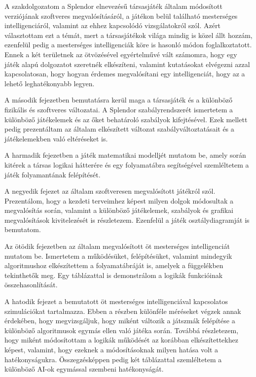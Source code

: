 
A szakdolgozatom a Splendor elnevezésű társasjáték általam módosított verziójának szoftveres megvalósításáról, a játékon belül található mesterséges intelligenciáról, valamint az ehhez kapcsolódó vizsgálatokról szól. Azért választottam ezt a témát, mert a társasjátékok világa mindig is közel állt hozzám, ezenfelül pedig a mesterséges intelligenciák köre is hasonló módon foglalkoztatott. Ennek a két területnek az ötvözésével egyértelművé vált számomra, hogy egy játék alapú dolgozatot szeretnék elkészíteni, valamint kutatásokat elvégezni azzal kapcsolatosan, hogy hogyan érdemes megvalósítani egy intelligenciát, hogy az a lehető leghatékonyabb legyen.

A második fejezetben bemutatásra kerül maga a társasjáték és a különböző fizikális és szoftveres változatai. A Splendor szabályrendszerét ismertetem a különböző játékelemek és az őket behatároló szabályok kifejtésével. Ezek mellett pedig prezentáltam az általam elkészített változat szabályváltoztatásait és a játékelemekben való eltéréseket is.

A harmadik fejezetben a játék matematikai modelljét mutatom be, amely során kitérek a társas logikai hátterére és egy folyamatábra segítségével szemléltetem a játék folyamantának felépítését.

A negyedik fejezet az általam szoftveresen megvalósított játékról szól. Prezentálom, hogy a kezdeti terveimhez képest milyen dolgok módosultak a megvalósítás során, valamint a különböző játékelemek, szabályok és grafikai megvalósítások kivitelezését is részletezem. Ezenfelül a játék osztálydiagramját is bemutatom.

Az ötödik fejezetben az általam megvalósított öt mesterséges intelligenciát mutatom be. Ismertetem a működésüket, felépítésüket, valamint mindegyik algoritmushoz elkészítettem a folyamatábráját is, amelyek a függelékben tekinthetők meg. Egy táblázattal is demonstrálom a logikák funkcióinak összehasonlítását.

A hatodik fejezet a bemutatott öt mesterséges intelligenciával kapcsolatos szimulációkat tartalmazza. Ebben a részben különféle méréseket végzek annak érdekében, hogy megvizsgáljuk, hogy miként változik a játszmák felépítése a különböző algoritmusok egymás ellen való játéka során. Továbbá részletezem, hogy miként módosítottam a logikák működését az korábban elkészítettekhez képest, valamint, hogy ezeknek a módosításoknak milyen hatása volt a hatékonyságukra. Összegzésképpen pedig két táblázattal szemléltetem a különböző AI-ok egymással szembeni hatékonyságát.